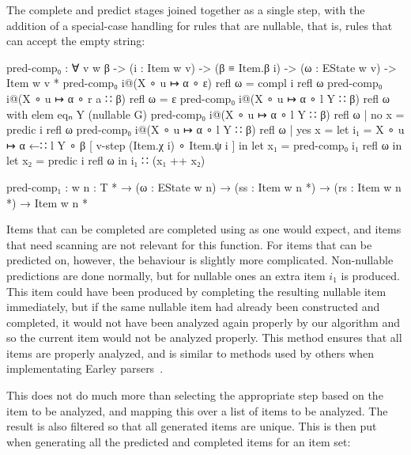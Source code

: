 		The complete and predict stages joined together as a single step, with 
		the addition of a special-case handling for rules that are nullable, 
		that is, rules that can accept the empty string:

		\begin{code}
			  pred-comp₀ : ∀ {v w β} ->
			    (i : Item w v) ->
			    (β ≡ Item.β i) ->
			    (ω : EState w v) ->
			    Item w v *
			  pred-comp₀ i@(X ∘ u ↦ α ∘ ε) refl ω = compl i refl ω
			  pred-comp₀ i@(X ∘ u ↦ α ∘ r a ∷ β) refl ω = ε
			  pred-comp₀ i@(X ∘ u ↦ α ∘ l Y ∷ β) refl ω with elem eqₙ Y (nullable G)
			  pred-comp₀ i@(X ∘ u ↦ α ∘ l Y ∷ β) refl ω | no x = predic i refl ω
			  pred-comp₀ i@(X ∘ u ↦ α ∘ l Y ∷ β) refl ω | yes x =
			    let i₁ = X ∘ u ↦ α ←∷ l Y ∘ β [ v-step (Item.χ i) ∘ Item.ψ i ] in
			    let x₁ = pred-comp₀ i₁ refl ω in
			    let x₂ = predic i refl ω in
			    i₁ ∷ (x₁ ++ x₂)

			  pred-comp₁ : {w n : T *} → (ω : EState w n) →
			    (ss : Item w n *) → (rs : Item w n *) → Item w n *
		\end{code}

		Items that can be completed are completed using  as one
		would expect, and items that need scanning are not relevant for this
		function. For items that can be predicted on, however, the behaviour is
		slightly more complicated. Non-nullable predictions are done normally,
		but for nullable ones an extra item $i_1$ is produced. This item could
		have been produced by completing the resulting nullable item
		immediately, but if the same nullable item had already been constructed
		and completed, it would not have been analyzed again properly by our
		algorithm and so the current item would not be analyzed properly. This
		method ensures that all items are properly analyzed, and is similar to
		methods used by others when implementating Earley
		parsers~\cite{aycock02}.
		
		This does not do much more than selecting the appropriate
		step based on the item to be analyzed, and mapping this over a list of
		items to be analyzed. The result is also filtered so that all generated
		items are unique. This is then put when generating all the predicted
		and completed items for an item set:

